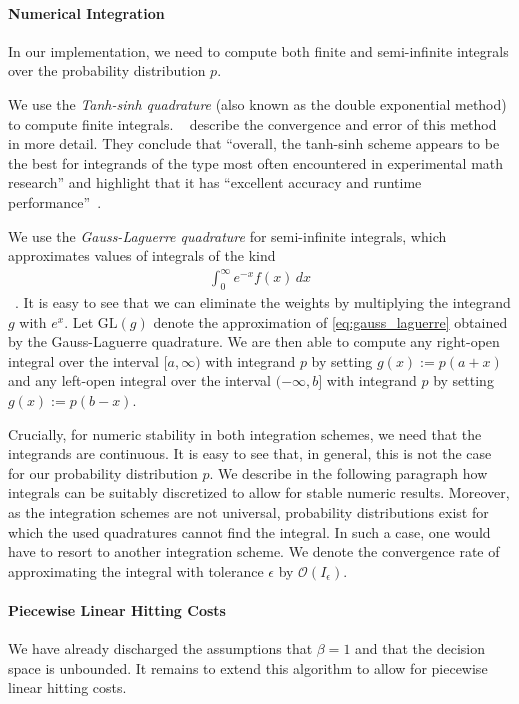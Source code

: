 \paragraph{Numerical Integration} In our implementation, we need to compute both finite and semi-infinite integrals over the probability distribution $p$.

We use the \emph{Tanh-sinh quadrature} (also known as the double exponential method) to compute finite integrals. \citeauthor{Bailey2005}~\cite{Bailey2005} describe the convergence and error of this method in more detail. They conclude that ``overall, the tanh-sinh scheme appears to be the best
for integrands of the type most often encountered in experimental math research'' and highlight that it has ``excellent accuracy and runtime performance''~\cite{Bailey2005}.

We use the \emph{Gauss-Laguerre quadrature} for semi-infinite integrals, which approximates values of integrals of the kind \begin{align}\label{eq:gauss_laguerre}
    \int_0^{\infty} e^{-x} f(x) \,dx
\end{align}~\cite{Weisstein}. It is easy to see that we can eliminate the weights by multiplying the integrand $g$ with $e^x$. Let $\text{GL}(g)$ denote the approximation of \cref{eq:gauss_laguerre} obtained by the Gauss-Laguerre quadrature. We are then able to compute any right-open integral over the interval $[{a,\infty})$ with integrand $p$ by setting $g(x) := p(a+x)$ and any left-open integral over the interval $({-\infty,b}]$ with integrand $p$ by setting $g(x) := p(b-x)$.

Crucially, for numeric stability in both integration schemes, we need that the integrands are continuous. It is easy to see that, in general, this is not the case for our probability distribution $p$. We describe in the following paragraph how integrals can be suitably discretized to allow for stable numeric results. Moreover, as the integration schemes are not universal, probability distributions exist for which the used quadratures cannot find the integral. In such a case, one would have to resort to another integration scheme. We denote the convergence rate of approximating the integral with tolerance $\epsilon$ by $\mathcal{O}(I_{\epsilon})$.

\paragraph{Piecewise Linear Hitting Costs} We have already discharged the assumptions that $\beta = 1$ and that the decision space is unbounded. It remains to extend this algorithm to allow for piecewise linear hitting costs.

